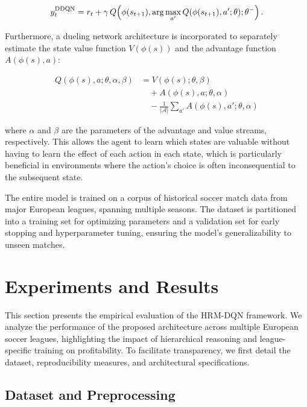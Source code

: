 \documentclass[3p,times,procedia]{elsarticle}
\begin{document}
\begin{equation}\label{eq:ddqn-target}
\small
y_t^{\text{DDQN}} 
= r_t + \gamma \, Q\!\left(\phi(s_{t+1}), \arg\max_{a'} Q(\phi(s_{t+1}), a'; \theta); \theta^- \right).
\end{equation}

Furthermore, a dueling network architecture \cite{wang2016dueling} is incorporated to separately estimate the state value function $V(\phi(s))$ and the advantage function $A(\phi(s), a)$:

\begin{align}\label{eq:dueling}
Q(\phi(s), a; \theta, \alpha, \beta) 
&= V(\phi(s); \theta, \beta) \nonumber \\
&\quad + A(\phi(s), a; \theta, \alpha) \nonumber \\
&\quad - \frac{1}{|\mathcal{A}|} \sum_{a'} A(\phi(s), a'; \theta, \alpha)
\end{align}

\noindent
where $\alpha$ and $\beta$ are the parameters of the advantage and value streams, respectively. This allows the agent to learn which states are valuable without having to learn the effect of each action in each state, which is particularly beneficial in environments where the action's choice is often inconsequential to the subsequent state.

The entire model is trained on a corpus of historical soccer match data from major European leagues, spanning multiple seasons. The dataset is partitioned into a training set for optimizing parameters and a validation set for early stopping and hyperparameter tuning, ensuring the model's generalizability to unseen matches.

\section{Experiments and Results} \label{sec:experiment}
This section presents the empirical evaluation of the HRM-DQN framework. We analyze the performance of the proposed architecture across multiple European soccer leagues, highlighting the impact of hierarchical reasoning and league-specific training on profitability. To facilitate transparency, we first detail the dataset, reproducibility measures, and architectural specifications.

\subsection{Dataset and Preprocessing}
\end{document}
